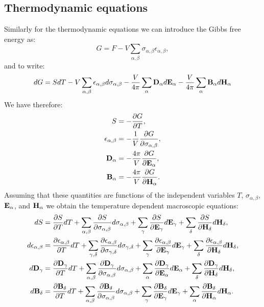 \documentclass[12pt,a4paper]{article}
\begin{document}
{\subsection{\color{web-blue}Thermodynamic equations}
Similarly for the thermodynamic equations we can introduce the Gibbs
free energy as:
\begin{equation}
G=F - V \sum_{\alpha,\beta} \sigma_{\alpha,\beta} \epsilon_{\alpha,\beta},
\end{equation}
and to write:
\begin{equation}
dG=SdT - V \sum_{\alpha,\beta} \epsilon_{\alpha,\beta} d \sigma_{\alpha,\beta}
-{V \over 4 \pi} \sum_{\alpha} {\bf D}_\alpha d {\bf E}_\alpha
-{V \over 4 \pi} \sum_{\alpha} {\bf B}_\alpha d {\bf H}_\alpha
\end{equation}
We have therefore:
\begin{align}
S&=-{\partial G \over \partial T}, \\
\epsilon_{\alpha,\beta}&= -{1\over V}
{\partial G \over \partial \sigma_{\alpha,\beta}}, \\
{\bf D}_{\alpha}&= -{4 \pi \over V}
{\partial G \over \partial {\bf E}_{\alpha}}, \\
{\bf B}_{\alpha}&= -{4 \pi \over V}
{\partial G \over \partial {\bf H}_{\alpha}}.
\end{align}
Assuming that these quantities are functions of the independent variables
$T$, $\sigma_{\alpha,\beta}$, ${\bf E}_\alpha$, and ${\bf H}_\alpha$ we
obtain the temperature dependent macroscopic equations:
\begin{align}
dS&= {\partial S \over \partial T} dT+\sum_{\alpha,\beta}
{\partial S \over \partial \sigma_{\alpha,\beta}}d\sigma_{\alpha,\beta}
+\sum_\gamma{\partial S \over \partial {\bf E}_{\gamma}}d{\bf E}_{\gamma}+ 
\sum_\delta{\partial S \over \partial {\bf H}_{\delta}}d{\bf H}_{\delta}, \\
d\epsilon_{\alpha,\beta}&= 
{\partial \epsilon_{\alpha,\beta} \over \partial T} dT+\sum_{\gamma,\delta}
{\partial \epsilon_{\alpha,\beta} \over \partial 
\sigma_{\gamma,\delta}}d\sigma_{\gamma,\delta}
+\sum_\gamma{\partial \epsilon_{\alpha,\beta} \over \partial 
{\bf E}_{\gamma}}d{\bf E}_{\gamma}+ 
\sum_\delta{\partial \epsilon_{\alpha,\beta} \over \partial 
{\bf H}_{\delta}}d{\bf H}_{\delta}, \\
d{\bf D}_\gamma&= 
{\partial  {\bf D}_\gamma \over \partial T} dT+\sum_{\alpha,\beta}
{\partial {\bf D}_\gamma \over \partial \sigma_{\alpha,\beta}}
d\sigma_{\alpha,\beta}
+\sum_\alpha{\partial {\bf D}_\gamma \over \partial {\bf E}_{\alpha}}d{\bf E}_{\alpha}+ 
\sum_\delta{\partial {\bf D}_\gamma \over \partial {\bf H}_{\delta}}d{\bf H}_{\delta}, \\
d{\bf B}_\delta&= 
{\partial {\bf B}_\delta \over \partial T} dT+\sum_{\alpha,\beta}
{\partial {\bf B}_\delta \over \partial \sigma_{\alpha,\beta}}
d\sigma_{\alpha,\beta}
+\sum_\gamma{\partial {\bf B}_\delta \over \partial {\bf E}_{\gamma}}
d{\bf E}_{\gamma}+ 
\sum_\alpha{\partial {\bf B}_\delta \over \partial {\bf H}_{\alpha}}
d{\bf H}_{\alpha}. 
\end{align}

}
\end{document}
